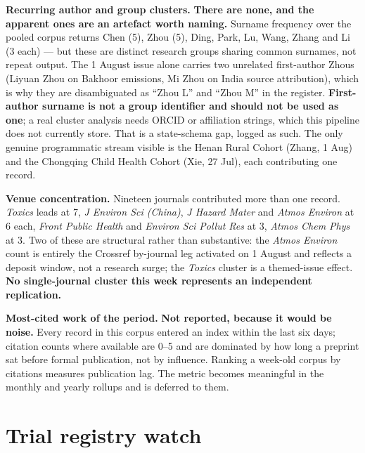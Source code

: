 \documentclass[10pt]{article}
\begin{document}
\footnotesize
\textbf{Recurring author and group clusters.} \textbf{There are none, and the apparent
ones are an artefact worth naming.} Surname frequency over the pooled corpus returns
Chen (5), Zhou (5), Ding, Park, Lu, Wang, Zhang and Li (3 each) --- but these are
distinct research groups sharing common surnames, not repeat output. The 1 August issue
alone carries two unrelated first-author Zhous (Liyuan Zhou on Bakhoor emissions, Mi Zhou
on India source attribution), which is why they are disambiguated as ``Zhou L'' and
``Zhou M'' in the register. \textbf{First-author surname is not a group identifier and
should not be used as one}; a real cluster analysis needs ORCID or affiliation strings,
which this pipeline does not currently store. That is a state-schema gap, logged as such.
The only genuine programmatic stream visible is the Henan Rural Cohort (Zhang, 1 Aug) and
the Chongqing Child Health Cohort (Xie, 27 Jul), each contributing one record.

\vspace{2mm}
\textbf{Venue concentration.} Nineteen journals contributed more than one record.
\textit{Toxics} leads at 7, \textit{J Environ Sci (China)}, \textit{J Hazard Mater} and
\textit{Atmos Environ} at 6 each, \textit{Front Public Health} and
\textit{Environ Sci Pollut Res} at 3, \textit{Atmos Chem Phys} at 3. Two of these are
structural rather than substantive: the \textit{Atmos Environ} count is entirely the
Crossref by-journal leg activated on 1 August and reflects a deposit window, not a
research surge; the \textit{Toxics} cluster is a themed-issue effect. \textbf{No
single-journal cluster this week represents an independent replication.}

\vspace{2mm}
\textbf{Most-cited work of the period.} \textbf{Not reported, because it would be noise.}
Every record in this corpus entered an index within the last six days; citation counts
where available are 0--5 and are dominated by how long a preprint sat before formal
publication, not by influence. Ranking a week-old corpus by citations measures
publication lag. The metric becomes meaningful in the monthly and yearly rollups and is
deferred to them.

\vspace{4mm}

\section*{\sffamily\bfseries\color{Deep}Trial registry watch}
\vspace{-1.5mm}{\color{Teal}\rule{\linewidth}{1.1pt}}\vspace{2.5mm}
\end{document}
